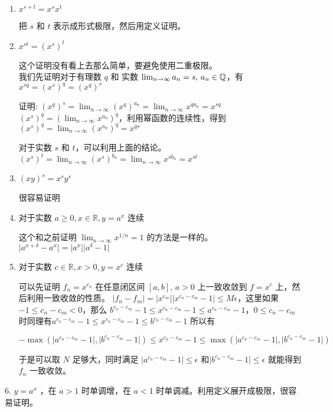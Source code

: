 \begin{enumerate}
    \item $x^{s+t} = x^sx^t$ 

    把 $s$ 和 $t$ 表示成形式极限，然后用定义证明。

    \item $x^{st} = (x^s)^t $

这个证明没有看上去那么简单，要避免使用二重极限。 \\
我们先证明对于有理数 $q$ 和 实数 $\lim_{n \to \infty}a_n = s,\, a_n \in \mathbb{Q}$，有 $x^{sq} = (x^s)^q = (x^q)^s$

证明: $(x^q)^s = \lim_{n \to \infty} (x^q)^{a_n} = \lim_{n \to \infty} x^{qa_n} = x^{sq} $ \\
$(x^s)^q = (\lim_{n \to \infty}x^{a_n})^q$，利用幂函数的连续性，得到 $(x^s)^q = \lim_{n \to \infty}(x^{a_n})^q = x^{qs}$

对于实数 $s$ 和 $t$，可以利用上面的结论。$(x^{s})^{t} = \lim_{n \to \infty}(x^s)^{b_n} = \lim_{n \to \infty}x^{s b_n} = x^{st}$


\item $(xy)^s = x^sy^s$ 

很容易证明

\item 对于实数 $a \ge 0, x \in \mathbb{R}, y = a^x$ 连续

这个和之前证明 $\lim_{n \to \infty}x^{1/n} = 1$ 的方法是一样的。$\lvert a^{x + \delta} - a^x \rvert = \lvert a^x\rvert \lvert a^{\delta} - 1\rvert$

\item 对于实数 $c \in \mathbb{R}, x > 0, y = x^c$ 连续


可以先证明 $f_n = x^{c_n}$ 在任意闭区间 $[a, b],\, a > 0$ 上一致收敛到 $f = x^c$ 上，然后利用一致收敛的性质。
$\lvert f_n - f_m \rvert  = \lvert  x^{c_m}\rvert \lvert x^{c_n - c_m} - 1\rvert \le M \epsilon $，这里如果 $ -1 \le c_n - c_m <0$，那么
$b^{c_n-c_m} - 1 \le x^{c_n - c_m} - 1 \le a^{c_n-c_m} - 1$，$ 0 \le c_n - c_m $ 时同理有$a^{c_n-c_m} - 1 \le x^{c_n - c_m} - 1 \le b^{c_n-c_m} - 1$
所以有

\[
-\max (\lvert a^{c_n-c_m} - 1 \rvert, \lvert b^{c_n-c_m} - 1 \rvert) \le x^{c_n - c_m} - 1 \le \max (\lvert a^{c_n-c_m} - 1 \rvert, \lvert b^{c_n-c_m} - 1 \rvert)
\]

于是可以取 $N$ 足够大，同时满足 $\lvert a^{c_n-c_m} - 1 \rvert \le \epsilon$ 和$\lvert b^{c_n-c_m} - 1 \rvert \le \epsilon$ 就能得到 $f_n$ 一致收敛。

\end{enumerate}
6. $y = a^x$ ，在 $a > 1$ 时单调增，在 $a < 1$ 时单调减。利用定义展开成极限，很容易证明。


